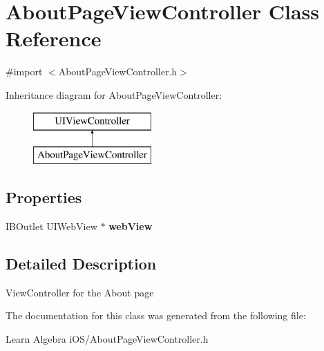 \hypertarget{interface_about_page_view_controller}{\section{About\-Page\-View\-Controller Class Reference}
\label{interface_about_page_view_controller}
}


{\ttfamily \#import $<$About\-Page\-View\-Controller.\-h$>$}

Inheritance diagram for About\-Page\-View\-Controller\-:\begin{figure}[H]
\begin{center}
\leavevmode
\includegraphics[height=2.000000cm]{interface_about_page_view_controller}
\end{center}
\end{figure}
\subsection*{Properties}
\begin{DoxyCompactItemize}
\item 
\hypertarget{interface_about_page_view_controller_ac06c6fc093c54d8c21d3fb1965d24be7}{I\-B\-Outlet U\-I\-Web\-View $\ast$ {\bfseries web\-View}}\label{interface_about_page_view_controller_ac06c6fc093c54d8c21d3fb1965d24be7}

\end{DoxyCompactItemize}


\subsection{Detailed Description}
View\-Controller for the About page 

The documentation for this class was generated from the following file\-:\begin{DoxyCompactItemize}
\item 
Learn Algebra i\-O\-S/About\-Page\-View\-Controller.\-h\end{DoxyCompactItemize}
